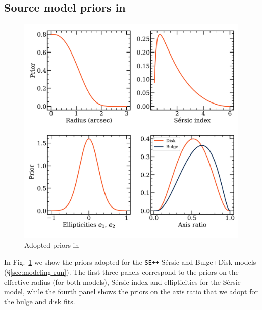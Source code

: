 \documentclass[longauth]{aa}
\begin{document}
\begin{appendix}
\section{Source model priors in \SEpp} \label{sec:appendix-SEclparams}

\begin{figure}[h!]
\centering
\includegraphics[width=0.98\columnwidth]{figures/Priors2.pdf}
\caption{Adopted priors in \SEpp}
\label{fig:priors}
\end{figure}

In Fig.~\ref{fig:priors} we show the priors adopted for the \texttt{SE++} Sérsic and Bulge+Disk models (\S \ref{sec:modeling-run}). The first three panels correspond to the priors on the effective radius (for both models), Sérsic index and ellipticities for the Sérsic model, while the fourth panel shows the priors on the axis ratio that we adopt for the bulge and disk fits.



\end{appendix}
\end{document}
